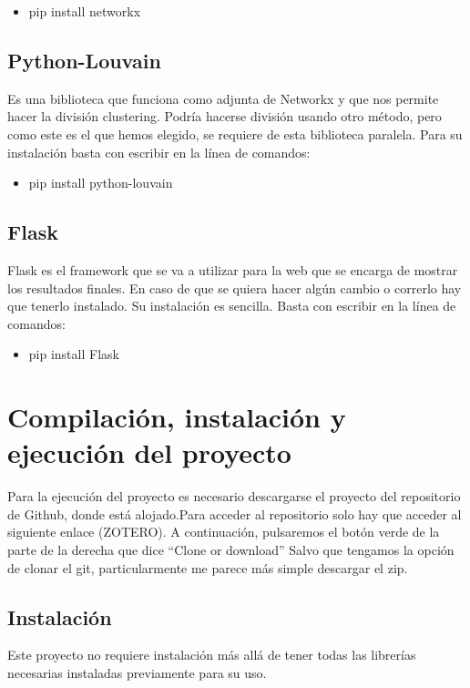 \begin{itemize}
    \item pip install networkx
\end{itemize}

\subsection{Python-Louvain}\cite{python-louvain}
Es una biblioteca que funciona como adjunta de Networkx y que nos permite hacer la división clustering. Podría hacerse división usando otro método, pero como este es el que hemos elegido, se requiere de esta biblioteca paralela.
Para su instalación basta con escribir en la línea de comandos:

\begin{itemize}
    \item pip install python-louvain
\end{itemize}

\subsection{Flask}
Flask es el framework que se va a utilizar para la web que se encarga de mostrar los resultados finales. En caso de que se quiera hacer algún cambio o correrlo hay que tenerlo instalado. Su instalación es sencilla. Basta con escribir en la línea de comandos:

\begin{itemize}
    \item pip install Flask
\end{itemize}


\section{Compilación, instalación y ejecución del proyecto}
Para la ejecución del proyecto es necesario descargarse el proyecto del repositorio de Github, donde está alojado.Para acceder al repositorio solo hay que acceder al siguiente enlace (ZOTERO). A continuación, pulsaremos el botón verde de la parte de la derecha que dice “Clone or download”
Salvo que tengamos la opción de clonar el git, particularmente me parece más simple descargar el zip.
\subsection{Instalación}
Este proyecto no requiere instalación más allá de tener todas las librerías necesarias instaladas previamente para su uso.

